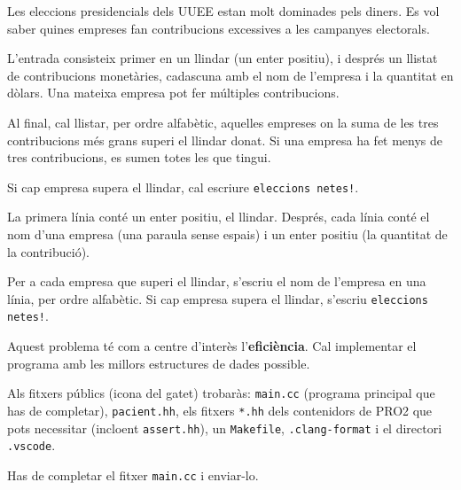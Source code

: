 

\Statement

Les eleccions presidencials dels UUEE estan molt dominades pels
diners. Es vol saber quines empreses fan contribucions excessives
a les campanyes electorals.

\medskip

L'entrada consisteix primer en un llindar (un enter positiu), i
després un llistat de contribucions monetàries, cadascuna amb el
nom de l'empresa i la quantitat en dòlars. Una mateixa empresa
pot fer múltiples contribucions.

\medskip

Al final, cal llistar, per ordre alfabètic, aquelles empreses on
la suma de les tres contribucions més grans superi el llindar
donat. Si una empresa ha fet menys de tres contribucions, es
sumen totes les que tingui.

\medskip

Si cap empresa supera el llindar, cal escriure 
\verb|eleccions netes!|.

\Input

La primera línia conté un enter positiu, el llindar. Després,
cada línia conté el nom d'una empresa (una paraula sense espais)
i un enter positiu (la quantitat de la contribució).

\Output

Per a cada empresa que superi el llindar, s'escriu el nom de
l'empresa en una línia, per ordre alfabètic. Si cap empresa
supera el llindar, s'escriu \verb|eleccions netes!|.

\Observation

Aquest problema té com a centre d'interès l'\textbf{eficiència}.
Cal implementar el programa amb les millors estructures de dades
possible.

\medskip

Als fitxers públics (icona del gatet) trobaràs: \verb|main.cc|
(programa principal que has de completar), \verb|pacient.hh|, els
fitxers \verb|*.hh| dels contenidors de PRO2 que pots necessitar
(incloent \verb|assert.hh|), un \verb|Makefile|,
\verb|.clang-format| i el directori \verb|.vscode|.

\medskip

Has de completar el fitxer \verb|main.cc| i enviar-lo.

\SampleTwoCol
